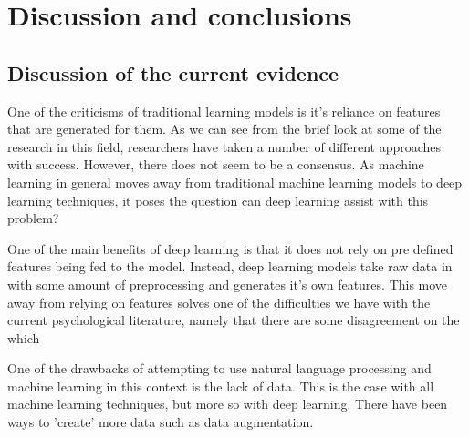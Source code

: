 \documentclass[12pt]{article}
\begin{document}
\section{Discussion and conclusions}\label{discussion}
\subsection{Discussion of the current evidence}
One of the criticisms of traditional learning models is it's reliance on features that are generated for them. As we can see from the brief look at some of the research in this field, researchers have taken a number of different approaches with success. However, there does not seem to be a consensus. As machine learning in general moves away from traditional machine learning models to deep learning techniques, it poses the question can deep learning assist with this problem?
\par 
One of the main benefits of deep learning is that it does not rely on pre defined features being fed to the model. Instead, deep learning models take raw data in with some amount of preprocessing and generates it's own features. This move away from relying on features solves one of the difficulties we have with the current psychological literature, namely that there are some disagreement on the which 
\par 
One of the drawbacks of attempting to use natural language processing and machine learning in this context is the lack of data. This is the case with all machine learning techniques, but more so with deep learning. There have been ways to 'create' more data such as data augmentation. 
\end{document}
